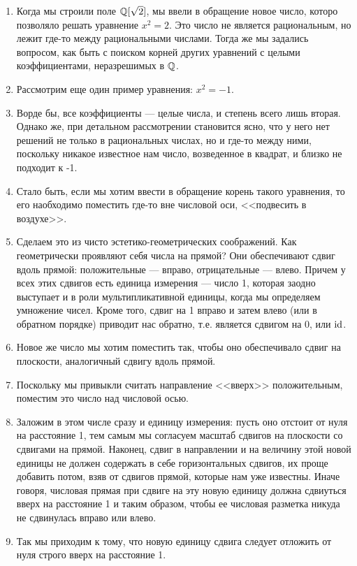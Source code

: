 \begin{enumerate}
\item Когда мы строили поле $\mathbb Q[\sqrt 2]$, мы ввели в обращение новое число, которо позволяло решать уравнение $x^2=2$. Это число не является рациональным, но лежит где-то между рациональными числами. Тогда же мы задались вопросом, как быть с поиском корней других уравнений с целыми коэффициентами, неразрешимых в $\mathbb Q$.
\item Рассмотрим еще один пример уравнения: $x^2=-1$.
\item Ворде бы, все коэффициенты --- целые числа, и степень всего лишь вторая. Однако же, при детальном рассмотрении становится ясно, что у него нет решений не только в рациональных числах, но и где-то между ними, поскольку никакое известное нам число, возведенное в квадрат, и близко не подходит к -1.
\item Стало быть, если мы хотим ввести в обращение корень такого уравнения, то его наобходимо поместить где-то вне числовой оси, <<подвесить в воздухе>>.
\item Сделаем это из чисто эстетико-геометрических соображений. Как геометрически проявляют себя числа на прямой? Они обеспечивают сдвиг вдоль прямой: положительные --- вправо, отрицательные --- влево. Причем у всех этих сдвигов есть единица измерения --- число 1, которая заодно выступает и в роли мультипликативной единицы, когда мы определяем умножение чисел. Кроме того, сдвиг на 1 вправо и затем влево (или в обратном порядке) приводит нас обратно, т.е. является сдвигом на 0, или $\mathrm{id}$.
\item Новое же число мы хотим поместить так, чтобы оно обеспечивало сдвиг на плоскости, аналогичный сдвигу вдоль прямой.
\item Поскольку мы привыкли считать направление <<вверх>> положительным, поместим это число над числовой осью.
\item Заложим в этом числе сразу и единицу измерения: пусть оно отстоит от нуля на расстояние 1, тем самым мы согласуем масштаб сдвигов на плоскости со сдвигами на прямой. Наконец, сдвиг в направлении и на величину этой новой единицы не должен содержать в себе горизонтальных сдвигов, их проще добавить потом, взяв от сдвигов прямой, которые нам уже известны. Иначе говоря, числовая прямая при сдвиге на эту новую единицу должна сдвиуться вверх на расстояние 1 и таким образом, чтобы ее числовая разметка никуда не сдвинулась вправо или влево.
\item Так мы приходим к тому, что новую единицу сдвига следует отложить от нуля строго вверх на расстояние 1.

\end{enumerate}
